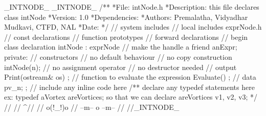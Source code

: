 \BeginCppCode
\Hifnde _INTNODE_
\Hdefin _INTNODE_
{\BBC}/**
\BL
  *File: intNode.h
\BL
  *Description:
\BL
   this file declares class intNode
\BL
  *Version: 1.0
\BL
  *Dependencies:
\BL
  *Authors: Premalatha, Vidyadhar Mudkavi, CTFD, NAL
\BL
  *Date:
  */{\EBC}
\BL
{\BLC}// system includes{\ELC}
\BL
{\BLC}// local includes{\ELC}
\Hinclud {\dq}exprNode.h{\dq}
\BL
{\BLC}// const declarations{\ELC}
\BL
{\BLC}// function prototypes{\ELC}
\BL
{\BLC}// forward declarations{\ELC}
\BL
{\BLC}// begin class declaration{\ELC}
\Clas intNode : \Publi exprNode
{\ob}
{\BLC}// make the handle a friend{\ELC}
   \Frien \Clas anExpr;
\BL
   private:
   {\BLC}// constructors{\ELC}
   {\BLC}// no default behaviour{\ELC}
   {\BLC}// no copy construction{\ELC}
      intNode(\In n);
\BL
   {\BLC}// no assignment operator{\ELC}
   {\BLC}// no destructor needed{\ELC}
\BL
   {\BLC}// output{\ELC}
      \Voi Print(ostream& os) \Cons;
\BL
   {\BLC}// function to evaluate the expression{\ELC}
      \In Evaluate() \Cons;
\BL
   {\BLC}// data{\ELC}
      \In pv_n;
{\cb};
\BL
{\BLC}// include any inline code here{\ELC}
\BL
{\BBC}/**
   declare any typedef statements here
     ex: typedef aVortex areVortices;
   so that we can declare
     areVortices v1, v2, v3;
  */{\EBC}
                              {\BLC}//                 {\ELC}
                              {\BLC}//      {\bs}{\bs}^//      {\ELC}
                              {\BLC}//     o(!_!)o     {\ELC}
                              {\BLC}// --m--  o  --m-- {\ELC}
                              {\BLC}//                 {\ELC}
\BL
\Hendi {\BLC}//_INTNODE_{\ELC}
\EndCppCode
